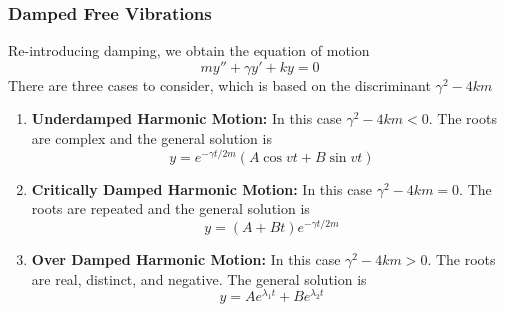 \documentclass[11pt]{article}
\begin{document}
\subsubsection{Damped Free Vibrations}
Re-introducing damping, we obtain the equation of motion $$my'' +\gamma y' + ky = 0$$ There are three cases to consider, which is based on the discriminant $\gamma^2 - 4km$
\begin{enumerate}
\item \textbf{Underdamped Harmonic Motion:} In this case $\gamma^2 - 4km < 0$. The roots are complex and the general solution is 
$$ y = e^{-\gamma t/2m}(A\cos vt + B\sin vt)$$
\item \textbf{Critically Damped Harmonic Motion:} In this case $\gamma^2 - 4km = 0$. The roots are repeated and the general solution is 
$$ y = (A+Bt)e^{-\gamma t/2m}$$
\item \textbf{Over Damped Harmonic Motion:} In this case $\gamma^2 - 4km > 0$. The roots are real, distinct, and negative. The general solution is 
$$ y = Ae^{\lambda_1 t} + Be^{\lambda_2 t}$$

\end{enumerate}
\end{document}

